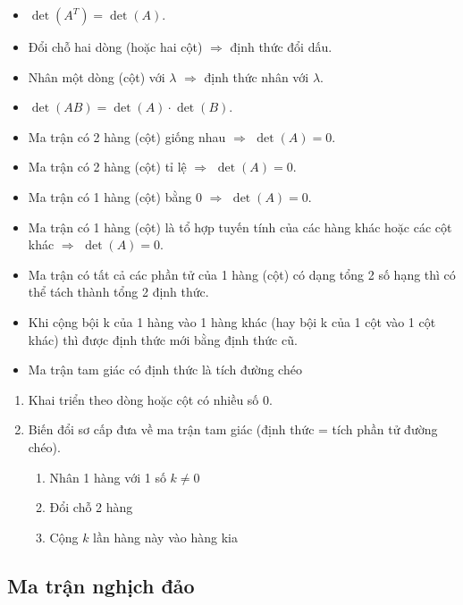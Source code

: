 \documentclass[12pt,a4paper]{article}
\begin{document}
\begin{dinhly}[title={Tính chất định thức}]
  \begin{itemize}
    \item $\det(A^T) = \det(A)$.
    \item Đổi chỗ hai dòng (hoặc hai cột) $\Rightarrow$ định thức đổi dấu.
    \item Nhân một dòng (cột) với $\lambda$ $\Rightarrow$ định thức nhân với $\lambda$.
    \item $\det(AB) = \det(A) \cdot \det(B)$.
    \item Ma trận có 2 hàng (cột) giống nhau $\Rightarrow$ $\det(A) = 0$.
    \item Ma trận có 2 hàng (cột) tỉ lệ $\Rightarrow$ $\det(A) = 0$.
    \item Ma trận có 1 hàng (cột) bằng 0 $\Rightarrow$ $\det(A) = 0$.
    \item Ma trận có 1 hàng (cột) là tổ hợp tuyến tính của các hàng khác hoặc các cột khác $\Rightarrow$ $\det(A) = 0$.
    \item Ma trận có tất cả các phần tử của 1 hàng (cột) có dạng tổng 2 số hạng thì có thể tách thành tổng 2 định thức.
    \item Khi cộng bội k của 1 hàng vào 1 hàng khác (hay bội k của 1 cột vào 1 cột khác) thì được định thức mới bằng định thức cũ.
    \item Ma trận tam giác có định thức là tích đường chéo
  \end{itemize}
\end{dinhly}

\begin{phuongphap}[title={Tính định thức}]
  \begin{enumerate}
    \item Khai triển theo dòng hoặc cột có nhiều số 0.
    \item Biến đổi sơ cấp đưa về ma trận tam giác (định thức = tích phần tử đường chéo).
    \begin{enumerate}
      \item Nhân 1 hàng với 1 số $k \ne 0$
      \item Đổi chỗ 2 hàng
      \item Cộng $k$ lần hàng này vào hàng kia
    \end{enumerate}
  \end{enumerate}
\end{phuongphap}

\subsection{Ma trận nghịch đảo}
\end{document}
